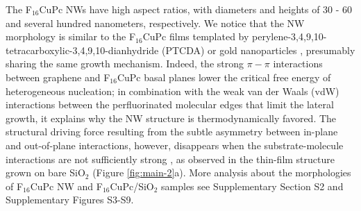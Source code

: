 \documentclass[journal=nalefd,manuscript=letter,email=true,hyperref=true,keywords=true]{achemso}
\begin{document}
The F\(_{\text{16}}\)CuPc NWs have high aspect ratios, with diameters and heights
of 30 - 60 and several hundred nanometers, respectively. We notice that
the NW morphology is similar to the F\(_{\text{16}}\)CuPc films templated by
perylene-3,4,9,10-tetracarboxylic-3,4,9,10-dianhydride (PTCDA)
\cite{Yang_2009_F16_PTCDA} or gold nanoparticles
\cite{Mbenkum_2006_F16_1D}, presumably sharing the same growth
mechanism. Indeed, the strong \(\pi-\pi\) interactions between graphene
and F\(_{\text{16}}\)CuPc basal planes lower the critical free energy of
heterogeneous nucleation; in combination with the weak van der Waals
(vdW) interactions between the perfluorinated molecular edges that
limit the lateral growth, it explains why the NW structure is
thermodynamically favored. The structural driving force resulting from
the subtle asymmetry between in-plane and out-of-plane interactions,
however, disappears when the substrate-molecule interactions are not
sufficiently strong \cite{Tian_2017}, as observed in the thin-film
structure grown on bare SiO\(_{\text{2}}\) (Figure \ref{fig:main-2}a). More analysis
about the morphologies of F\(_{\text{16}}\)CuPc NW and F\(_{\text{16}}\)CuPc/SiO\(_{\text{2}}\) samples
see Supplementary Section S2 and Supplementary Figures S3-S9.
\end{document}
